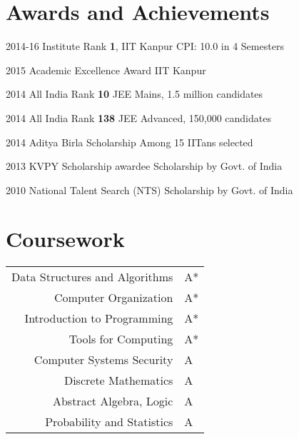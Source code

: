 \documentclass{tccv}
\begin{document}
\vspace{-0.7cm}
\section{Awards and Achievements}

\begin{yearlist}

\item{\small{2014-16}}
  {Institute Rank \textbf{1}, IIT Kanpur}
  {\small{CPI: 10.0 in 4 Semesters}}

\item{\small{2015}}
  {Academic Excellence Award}
  {\small{IIT Kanpur}}

\item{\small{2014}}
  {All India Rank \textbf{10}}
  {\small{JEE Mains, 1.5 million candidates}}

\item {\small{2014}}
  {All India Rank \textbf{138}}
  {\small{JEE Advanced, 150,000 candidates}}

\item {\small{2014}}
  {Aditya Birla Scholarship}
  {\small{Among 15 IITans selected}}

\item {\small{2013}}
  {KVPY Scholarship awardee}
  {\small{Scholarship by Govt. of India}}

\item {\small{2010}}
  {National Talent Search (NTS)}
  {\small{Scholarship by Govt. of India}}

\end{yearlist}

\vspace{-0.6cm}
\section{Coursework}
\begin{tabularx}{\linewidth}{ r l }
  Data Structures and Algorithms & A*\\
  Computer Organization & A*\\
  Introduction to Programming & A*\\
  Tools for Computing & A*\\
  Computer Systems Security & A\\
  Discrete Mathematics & A\\
  Abstract Algebra, Logic & A\\
  Probability and Statistics & A\\
\end{tabularx}
\end{document}
